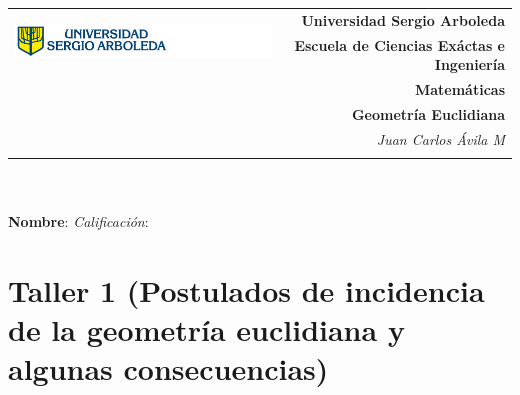 \documentclass[12pt,letterpaper]{exam}
\newcommand{\base}[1]{\underline{\hspace{#1}}}
\newcommand{\uni}{Universidad Sergio Arboleda}
\newcommand{\fac}{\normalsize{Escuela de Ciencias Ex\'actas e Ingenier\'ia}}
\newcommand{\dep}{Matem\'aticas}
\newcommand{\mat}{Geometría Euclidiana} %
\newcommand{\tema}{} %
\newcommand{\autor}{Juan Carlos Ávila M}
\begin{document}
\begin{tabular}{lr}
    \multirow{2}{*}{\includegraphics[height=1.4cm]{logosergio.png}} &
    {\textbf{\uni}} \\
    & {\textbf{\fac}} \\
    & {\textbf{\dep}} \\
    & {\textbf{\mat \tema}} \\
    & {\textit{\autor}} \\
    & {\textit{}}
\end{tabular}\\
\base{19.5cm}\\
\textbf{Nombre}:  \quad 
\textit{Calificaci\'on}: \base{2cm} \\[6pt]

\section*{Taller 1 (Postulados de incidencia de la geometr\'ia euclidiana y algunas consecuencias)}
\end{document}
